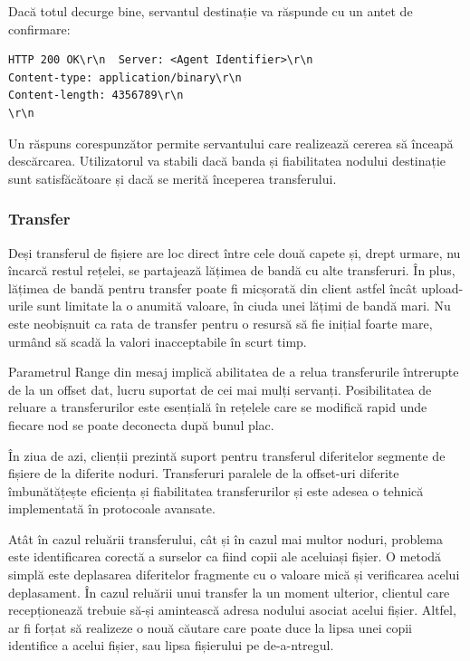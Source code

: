 Dacă totul decurge bine, servantul destinație va răspunde cu un antet de
confirmare:

\begin{verbatim}
HTTP 200 OK\r\n  Server: <Agent Identifier>\r\n
Content-type: application/binary\r\n
Content-length: 4356789\r\n
\r\n
\end{verbatim}

Un răspuns corespunzător permite servantului care realizează cererea să
înceapă descărcarea. Utilizatorul va stabili dacă banda și fiabilitatea
nodului destinație sunt satisfăcătoare și dacă se merită începerea
transferului.

\subsubsection{Transfer}

Deși transferul de fișiere are loc direct între cele două capete și, drept
urmare, nu încarcă restul rețelei, se partajează lățimea de bandă cu alte
transferuri. În plus, lățimea de bandă pentru transfer poate fi micșorată din
client astfel încât upload-urile sunt limitate la o anumită valoare, în ciuda
unei lățimi de bandă mari. Nu este neobișnuit ca rata de transfer pentru o
resursă să fie inițial foarte mare, urmând să scadă la valori inacceptabile în
scurt timp.

Parametrul Range din mesaj implică abilitatea de a relua transferurile
întrerupte de la un offset dat, lucru suportat de cei mai mulți servanți.
Posibilitatea de reluare a transferurilor este esențială în rețelele care se
modifică rapid unde fiecare nod se poate deconecta după bunul plac.

În ziua de azi, clienții prezintă suport pentru transferul diferitelor
segmente de fișiere de la diferite noduri. Transferuri paralele de la
offset-uri diferite îmbunătățește eficiența și fiabilitatea transferurilor și
este adesea o tehnică implementată în protocoale avansate.

Atât în cazul reluării transferului, cât și în cazul mai multor noduri,
problema este identificarea corectă a surselor ca fiind copii ale aceluiași
fișier. O metodă simplă este deplasarea diferitelor fragmente cu o valoare
mică și verificarea acelui deplasament. În cazul reluării unui transfer la un
moment ulterior, clientul care recepționează trebuie să-și amintească adresa
nodului asociat acelui fișier. Altfel, ar fi forțat să realizeze o nouă
căutare care poate duce la lipsa unei copii identifice a acelui fișier, sau
lipsa fișierului pe de-a-ntregul.

